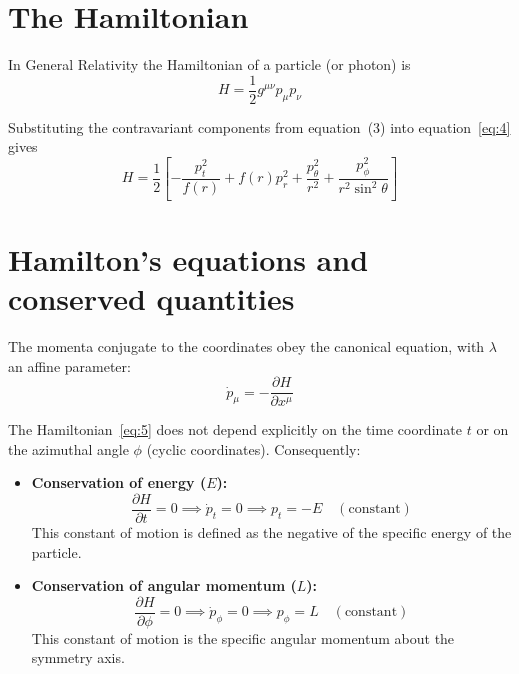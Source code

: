 \documentclass[11pt,a4paper]{article}
\begin{document}
\section{The Hamiltonian}

In General Relativity the Hamiltonian of a particle (or photon) is
\begin{equation*}
H = \frac{1}{2} g^{\mu\nu} p_\mu p_\nu \tag{4}\label{eq:4}
\end{equation*}

Substituting the contravariant components from equation~(3) into equation~\eqref{eq:4} gives
\begin{equation*}
H = \frac{1}{2} \left[ -\frac{p_t^2}{f(r)} + f(r) p_r^2 + \frac{p_\theta^2}{r^2} + \frac{p_\phi^2}{r^2 \sin^2\theta} \right] \tag{5}\label{eq:5}
\end{equation*}

\section{Hamilton's equations and conserved quantities}

The momenta conjugate to the coordinates obey the canonical equation, with $\lambda$ an affine parameter:
\begin{equation*}
\dot{p}_\mu = -\frac{\partial H}{\partial x^\mu} \tag{6}\label{eq:6}
\end{equation*}

The Hamiltonian~\eqref{eq:5} does not depend explicitly on the time coordinate $t$ or on the azimuthal angle $\phi$ (cyclic coordinates). Consequently:
\begin{itemize}
  \item \textbf{Conservation of energy ($E$):}
  \begin{equation*}
  \frac{\partial H}{\partial t} = 0 \implies \dot{p}_t = 0 \implies p_t = -E \quad (\text{constant}) \tag{7a}\label{eq:7a}
  \end{equation*}
  This constant of motion is defined as the negative of the specific energy of the particle.

  \item \textbf{Conservation of angular momentum ($L$):}
  \begin{equation*}
  \frac{\partial H}{\partial \phi} = 0 \implies \dot{p}_\phi = 0 \implies p_\phi = L \quad (\text{constant}) \tag{7b}\label{eq:7b}
  \end{equation*}
  This constant of motion is the specific angular momentum about the symmetry axis.
\end{itemize}
\end{document}
